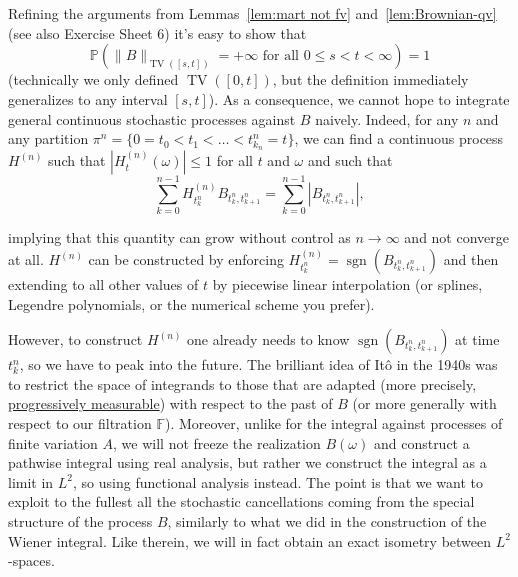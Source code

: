 \documentclass{article}
\newcommand{\textbf}[1]{\text{{\bfseries{#1}}}}
\newcommand{\1}{\1}
\begin{document}
{\

\begin{center}
  \hrulefill\hrulefill\textbf{ End of the lecture on November 28}
  \hrulefill\hrulefill
\end{center}

\

Refining the arguments from Lemmas~\ref{lem:mart not fv}
and~\ref{lem:Brownian-qv} (see also Exercise Sheet 6) it's easy to show that
\[ \mathbb{P} \left( \| B \|_{\operatorname{TV} ([s, t])} = + \infty \text{ for all }
   0 \leqslant s < t < \infty \right) = 1 \]
(technically we only defined $\operatorname{TV} ([0, t])$, but the definition
immediately generalizes to any interval $[s, t]$). As a consequence, we cannot
hope to integrate general continuous stochastic processes against $B$ naively.
Indeed, for any $n$ and any partition $\pi^n = \{ 0 = t_0 < t_1 < \ldots <
t^n_{k_n} = t \}$, we can find a continuous process $H^{(n)}$ such that
$|H^{(n)}_t (\omega) | \leqslant 1$ for all $t$ and $\omega$ and such that
\[ \sum_{k = 0}^{n - 1} H^{(n)}_{t^n_k} B_{t^n_k, t^n_{k + 1}} = \sum_{k =
   0}^{n - 1} | B_{t^n_k, t^n_{k + 1}} |, \]
\begin{flushleft}
  implying that this quantity can grow without control as $n \rightarrow
  \infty$ and not converge at all. $H^{(n)}$ can be constructed by enforcing
  $H^{(n)}_{t^n_k} = \operatorname{sgn} (B_{t^n_k, t^n_{k + 1}})$ and then extending
  to all other values of $t$ by piecewise linear interpolation (or splines,
  Legendre polynomials, or the numerical scheme you prefer).
\end{flushleft}

However, to construct $H^{(n)}$ one already needs to know $\operatorname{sgn}
(B_{t^n_k, t^n_{k + 1}})$ at time $t^n_k$, so we have to peak into the future.
The brilliant idea of It{\^o} in the 1940s was to restrict the space of
integrands to those that are adapted (more precisely,
{\underline{progressively measurable}}) with respect to the past of $B$ (or
more generally with respect to our filtration $\mathbb{F}$). Moreover, unlike
for the integral against processes of finite variation $A$, we will not freeze
the realization $B (\omega)$ and construct a pathwise integral using real
analysis, but rather we construct the integral as a limit in $L^2$, so using
functional analysis instead. The point is that we want to exploit to the
fullest all the stochastic cancellations coming from the special structure of
the process $B$, similarly to what we did in the construction of the Wiener
integral. Like therein, we will in fact obtain an exact isometry
between $L^2$-spaces.

}
\end{document}
